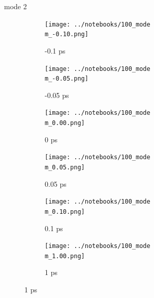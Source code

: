 \documentclass{beamer}
\begin{document}
\renewcommand\m{2}
\begin{frame}{mode \m}
	\begin{figure}
		\centering
		\begin{subfigure}[b]{\w\textwidth}
			\centering
			\texttt{[image: ../notebooks/100\_mode\\m\_-0.10.png]}
			\caption{-0.1 ps}
		\end{subfigure}
		\begin{subfigure}[b]{\w\textwidth}
			\centering
			\texttt{[image: ../notebooks/100\_mode\\m\_-0.05.png]}
			\caption{-0.05 ps}
		\end{subfigure}
		\begin{subfigure}[b]{\w\textwidth}
			\centering
			\texttt{[image: ../notebooks/100\_mode\\m\_0.00.png]}
			\caption{0 ps}
		\end{subfigure}
		\begin{subfigure}[b]{\w\textwidth}
			\centering
			\texttt{[image: ../notebooks/100\_mode\\m\_0.05.png]}
			\caption{0.05 ps}
		\end{subfigure}
		\begin{subfigure}[b]{\w\textwidth}
			\centering
			\texttt{[image: ../notebooks/100\_mode\\m\_0.10.png]}
			\caption{0.1 ps}
		\end{subfigure}
		\begin{subfigure}[b]{\w\textwidth}
			\centering
			\texttt{[image: ../notebooks/100\_mode\\m\_1.00.png]}
			\caption{1 ps}
		\end{subfigure}
	\end{figure}
\end{frame}
\end{document}
